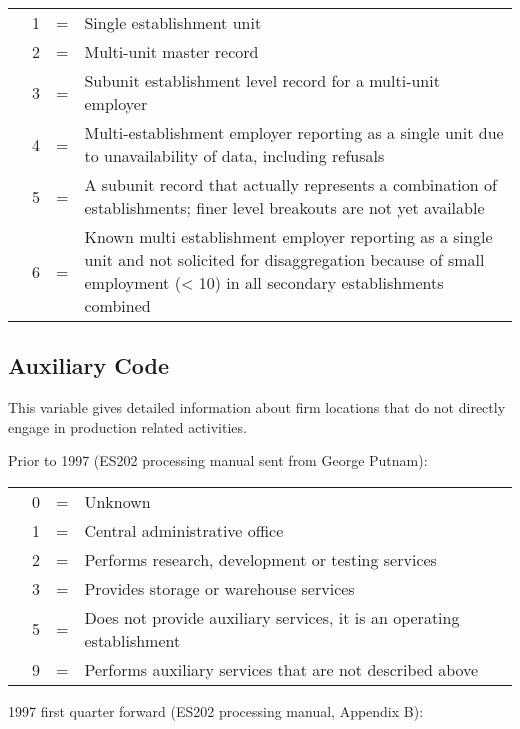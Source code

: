 \begin{tabular}{p{1cm}rcp{10cm}}
&1 &=& Single establishment unit\\
&2 &=& Multi-unit master record\\
&3 &=& Subunit establishment level record for a multi-unit employer\\
&4 &=& Multi-establishment employer reporting as a single unit due to 
unavailability of data, including refusals\\
&5 &=& A subunit record that actually represents a combination 
of establishments; finer level breakouts are not yet available\\
&6 &=& Known multi establishment employer reporting as a single unit and not 
solicited for disaggregation because of small employment (< 10) in all 
secondary establishments combined\\
\end{tabular}




\subsection {Auxiliary Code}





This variable gives detailed information about firm locations that do not 
directly engage in production related activities.





Prior to 1997 (ES202 processing manual sent from George Putnam):

\begin{tabular}{p{1cm}rcp{10cm}}
&0 &=& Unknown\\
&1 &=& Central administrative office\\
&2 &=& Performs research, development or testing services\\
&3 &=& Provides storage or warehouse services\\
&5 &=& Does not provide auxiliary services, it is an operating establishment\\
&9 &=& Performs auxiliary services that are not described above\\
\end{tabular}




1997 first quarter forward (ES202 processing manual, Appendix B):

